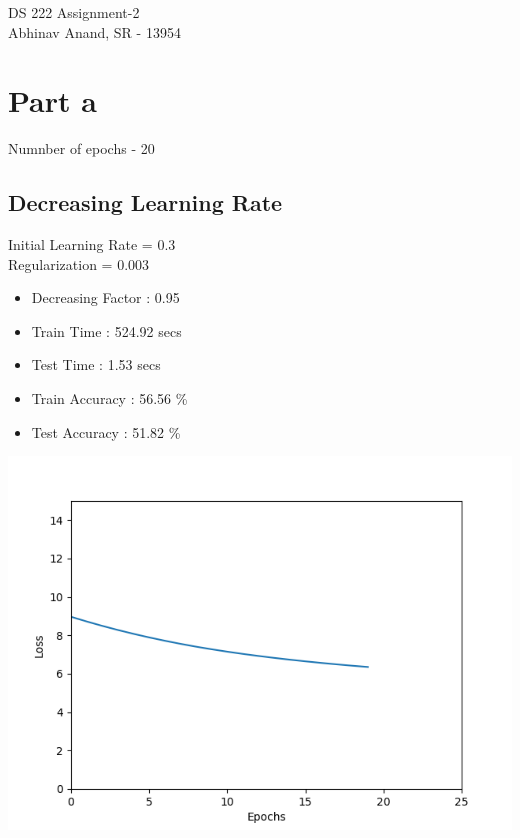 \documentclass[12pt]{article}
\begin{document}
\begingroup  
  \centering
  \LARGE DS 222 Assignment-2\\[1.5em]
  \large Abhinav Anand, SR - 13954\par
\endgroup

\section{Part a}
Numnber of epochs - 20

\subsection{Decreasing Learning Rate}
Initial Learning Rate = 0.3\\
Regularization = 0.003
\smallskip
\begin{itemize}
\item Decreasing Factor : 0.95
\item Train Time : 524.92 secs
\item Test Time :  1.53 secs
\item Train Accuracy : 56.56 \%
\item Test Accuracy : 51.82 \%
\end{itemize}
\includegraphics[scale = 0.5]{decreasing}
\end{document}
